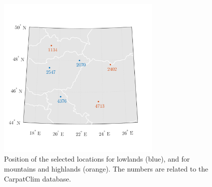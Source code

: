 \begin{figure}[htbp!]
	\centering    
	\includegraphics[width=0.7\textwidth]{posterior_locations.png}
	\caption{Position of the selected locations for lowlands (blue), and for mountains and highlands (orange). The numbers are related to the CarpatClim database.}
	\label{fig:posterior_locations}
\end{figure}



